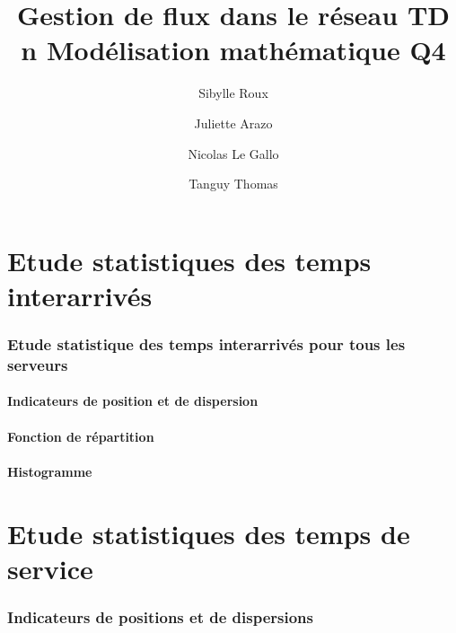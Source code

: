 \documentclass{article}
\begin{document}
\title{Gestion de flux dans le réseau
	\smallbreak
	TD n
	\smallbreak
	Modélisation mathématique
	\smallbreak
	Q4}
\author{Sibylle Roux \and Juliette Arazo \and Nicolas Le Gallo \and Tanguy Thomas}


\maketitle

\newpage

\tableofcontents

\newpage

\part{Etude statistiques des temps interarrivés}

\section{Etude statistique des temps interarrivés pour tous les serveurs}

\subsection{Indicateurs de position et de dispersion}

\subsection{Fonction de répartition}

\subsection{Histogramme}



\part{Etude statistiques des temps de service}

\section{Indicateurs de positions et de dispersions}
\end{document}
